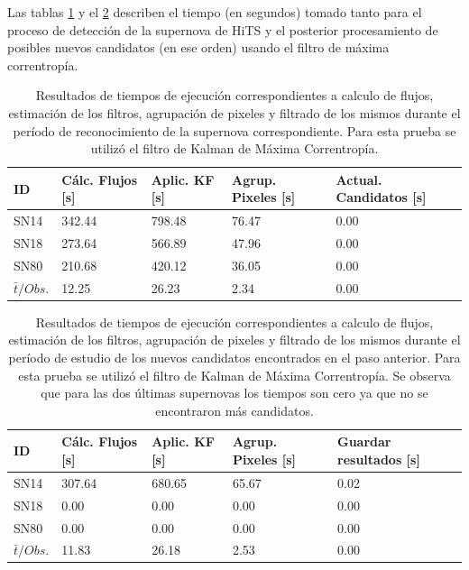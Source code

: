 Las tablas \ref{tab:t3} y el \ref{tab:t4} describen el tiempo (en segundos) tomado tanto para el proceso de detecci\'on de la supernova de HiTS y el posterior procesamiento de posibles nuevos candidatos (en ese orden) usando el filtro de m\'axima correntrop\'ia.
\bigskip
 
\begin{table}[h!]
\centering
\caption{Resultados de tiempos de ejecuci\'on correspondientes a calculo de flujos, estimaci\'on de los filtros, agrupaci\'on de pixeles y filtrado de los mismos durante el per\'iodo de reconocimiento de la supernova correspondiente. Para esta prueba se utiliz\'o el filtro de Kalman de M\'axima Correntrop\'ia.}
\begin{tabular}{|l|l|l|l|l|}
\hline
\textbf{ID} & \textbf{C\'alc. Flujos [s]} & \textbf{Aplic. KF [s]} &  \textbf{Agrup. Pixeles [s]}  & \textbf{Actual. Candidatos [s]}\\ \hline \hline
SN14        & 342.44            & 798.48        &  76.47 & 0.00 \\ \hline
SN18            & 273.64             & 566.89         &  47.96  & 0.00\\ \hline
SN80            & 210.68             & 420.12         &   36.05 & 0.00 \\ \hline \hline 
$\bar{t}/Obs. $& 12.25 & 26.23 & 2.34 & 0.00\\\hline 
\end{tabular}
\label{tab:t3}
\end{table}

\begin{table}[h!]
\centering
\caption{Resultados de tiempos de ejecuci\'on correspondientes a calculo de flujos, estimaci\'on de los filtros, agrupaci\'on de pixeles y filtrado de los mismos durante el per\'iodo de estudio de los nuevos candidatos encontrados en el paso anterior. Para esta prueba se utiliz\'o el filtro de Kalman de M\'axima Correntrop\'ia. Se observa que para las dos \'ultimas supernovas los tiempos son cero ya que no se encontraron m\'as candidatos.}
\begin{tabular}{|l|l|l|l|l|}
\hline
\textbf{ID} & \textbf{C\'alc. Flujos [s]} & \textbf{Aplic. KF [s]} &  \textbf{Agrup. Pixeles [s]}  & \textbf{Guardar resultados [s]}\\ \hline \hline
SN14        & 307.64            & 680.65        &  65.67 & 0.02 \\ \hline
SN18            & 0.00             & 0.00         &  0.00  & 0.00\\ \hline
SN80            & 0.00             & 0.00         &   0.00 & 0.00 \\ \hline \hline
$\bar{t}/Obs. $& 11.83 & 26.18 & 2.53 & 0.00\\\hline  
\end{tabular}
\label{tab:t4}

\end{table}
\bigskip

